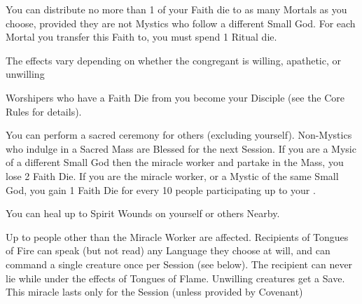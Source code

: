 {You can distribute no more than 1 of your Faith die to as many Mortals as you choose, provided they are not Mystics who follow a different Small God.  For each Mortal you transfer this Faith to, you must spend 1 Ritual die.

The effects vary depending on whether the congregant is willing, apathetic, or unwilling


Worshipers who have a Faith Die from you become your Disciple (see the Core Rules for details).


You can perform a sacred ceremony for \SUMDICE others (excluding yourself).  Non-Mystics who indulge in a Sacred Mass are Blessed for the next Session.  If you are a Mysic of a different Small God then the miracle worker and partake in the Mass, you lose 2 Faith Die.  If you are the miracle worker, or a Mystic of the same Small God, you gain 1 Faith Die for every 10 people participating up to your \LVL.





You can heal up to \DICE Spirit Wounds on yourself or others Nearby.




Up to \SUMDICE people other than the Miracle Worker are affected.  Recipients of Tongues of Fire can speak (but not read) any Language they choose at will, and can command a single creature once per Session (see below).  The recipient can never lie while under the effects of Tongues of Flame.  Unwilling creatures get a Save.  This miracle lasts only for the Session (unless provided by Covenant)



}
